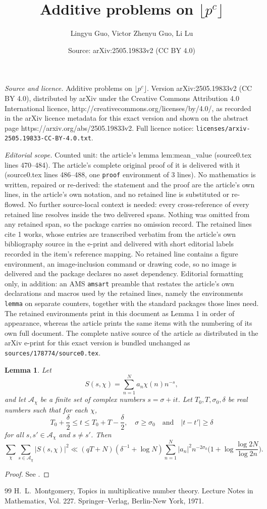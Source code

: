 \documentclass[10pt,a4paper]{amsart}
\title{Additive problems on $\lfloor p^c \rfloor$}
\author{Lingyu Guo, Victor Zhenyu Guo, Li Lu}
\date{Source: arXiv:2505.19833v2 (CC BY 4.0)}
\newtheorem{lemma}{Lemma}
\begin{document}
\maketitle

\noindent\emph{Source and licence.} Additive problems on $\lfloor p^c \rfloor$. Version arXiv:2505.19833v2 (CC BY 4.0), distributed by arXiv under the Creative Commons Attribution 4.0 International licence, http://creativecommons.org/licenses/by/4.0/, as recorded in the arXiv licence metadata for this exact version and shown on the abstract page https://arxiv.org/abs/2505.19833v2. Full licence notice: \texttt{licenses/arxiv-2505.19833-CC-BY-4.0.txt}.\par\smallskip

\noindent\textit{Editorial scope.} Counted unit: the article's lemma lem:mean\_value (source0.tex lines 470--484). The article's complete original proof of it is delivered with it (source0.tex lines 486--488, one \texttt{proof} environment of 3 lines). No mathematics is written, repaired or re-derived: the statement and the proof are the article's own lines, in the article's own notation, and no retained line is substituted or re-flowed.  No further source-local context is needed: every cross-reference of every retained line resolves inside the two delivered spans.  Nothing was omitted from any retained span, so the package carries no omission record.  The retained lines cite 1 works, whose entries are transcribed verbatim from the article's own bibliography source in the e-print and delivered with short editorial labels recorded in the item's reference mapping.  No retained line contains a figure environment, an image-inclusion command or drawing code, so no image is delivered and the package declares no asset dependency.  Editorial formatting only, in addition: an AMS \texttt{amsart} preamble that restates the article's own declarations and macros used by the retained lines, namely the environments \texttt{lemma} on separate counters, together with the standard packages those lines need.  The retained environments print in this document as Lemma 1 in order of appearance, whereas the article prints the same items with the numbering of its own full document.  The complete native source of the article as distributed in the arXiv e-print for this exact version is bundled unchanged as \texttt{sources/178774/source0.tex}.
\begin{lemma}
\label{lem:mean_value}
Let 
$$
S(s,\chi)=\sum_{n=1}^{N}a_n\chi(n)n^{-s},
$$
and let $\mathcal{A}_\chi$ be a finite set of complex numbers $s=\sigma+it$. Let $T_0,T,\sigma_0,\delta$ be real numbers such that for each $\chi$,
$$
T_0+\frac{\delta}{2}\leqslant t\leqslant T_0+T-\frac{\delta}{2},\quad \sigma\geqslant \sigma_0 \quad \text{and} \quad |t-t'|\geqslant \delta 
$$
for all $s,s'\in\mathcal{A}_\chi$ and $s\neq s'$. Then 
$$
\sum_{\chi}\sum_{s\in \mathcal{A}_\chi}|S(s,\chi)|^2\ll (qT+N)(\delta^{-1}+\log N)\sum_{n=1}^{N}|a_n|^2n^{-2\sigma_0}\bigg( 1+\log \frac{\log 2N}{\log 2n} \bigg).
$$ 
\end{lemma}

\begin{proof}
See \cite[Theorem~7.6]{Montgomery2}.
\end{proof}

\begin{thebibliography}{99}
 H.~L.~Montgomery, Topics in multiplicative number theory. Lecture Notes in Mathematics, Vol. 227. Springer--Verlag, Berlin-New York, 1971.
\end{thebibliography}
\end{document}
